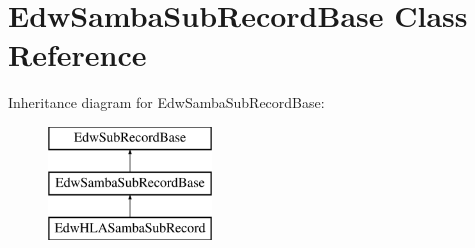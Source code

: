 \hypertarget{class_edw_samba_sub_record_base}{
\section{EdwSambaSubRecordBase Class Reference}
\label{class_edw_samba_sub_record_base}
}
Inheritance diagram for EdwSambaSubRecordBase:\begin{figure}[H]
\begin{center}
\leavevmode
\includegraphics[height=3cm]{class_edw_samba_sub_record_base}
\end{center}
\end{figure}
